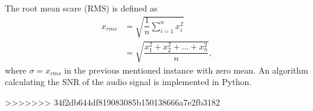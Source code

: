 The root mean scare (RMS) is defined as
\begin{align*}
	x_{rms} 
	&=\sqrt{\dfrac{1}{n} \sum_{i=1}^n x_i^2}\\
	&= \sqrt{\dfrac{x_1^2 + x_2^2 + \dots + x_n^2}{n}},
\end{align*}
where $\sigma = x_{rms}$ in the previous mentioned instance with zero mean. An algorithm calculating the SNR of the audio signal is implemented in Python.

%









>>>>>>> 34f2db644df819083085b150138666a7e2fb3182

